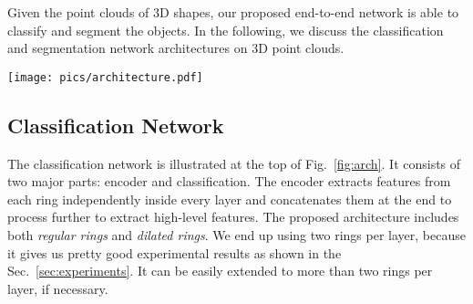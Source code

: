 \documentclass[10pt,twocolumn,letterpaper]{article}
\begin{document}
Given the point clouds of 3D shapes, our proposed end-to-end network is able to classify and segment the objects. In the following, we discuss the classification and segmentation network architectures on 3D point clouds.

\begin{figure*}[t]
\begin{center}
  \texttt{[image: pics/architecture.pdf]}\vspace{-5mm}
\end{center}
\caption{The architecture of A-CNN. Both classification and segmentation networks share encoder part for the feature extraction. Normals are used only to determine the order of neighboring points in the local regions (dashed arrows mean no backpropagation during training) and not used as additional features, unless it is mentioned explicitly in the experiments. $N$, $N_1$, $N_2$ (where $N > N_1 > N_2$) are the numbers of points as input, after  the first and second layer, respectively. $K$ and $K'$ are the unordered and ordered points inside the local rings, respectively. $c$ is the number of classification classes. $m$ is the number of segmentation classes. ``FPS'' stands for Farthest Point Sampling algorithm. ``mlp'' stands for multi-layer perceptron. $conv_{1\times3}(F_1, F_2, ..., F_n)$ stands for annular convolutions with the kernel size $1 \times 3$ applied sequentially with corresponding feature map sizes $F_i, i\in{1, ..., n}$.}\vspace{-3mm}
\centering
\label{fig:arch}
\end{figure*}
\vspace{-1mm}
\subsection{Classification Network}\vspace{-1mm}
The classification network is illustrated at the top of Fig.~\ref{fig:arch}. It consists of two major parts: encoder and classification. The encoder extracts features from each ring independently inside every layer and concatenates them at the end to process further to extract high-level features. The proposed architecture includes both \emph{regular rings} and \emph{dilated rings}. We end up using two rings per layer, because it gives us pretty good experimental results as shown in the Sec.~\ref{sec:experiments}. It can be easily extended to more than two rings per layer, if necessary.
\end{document}
